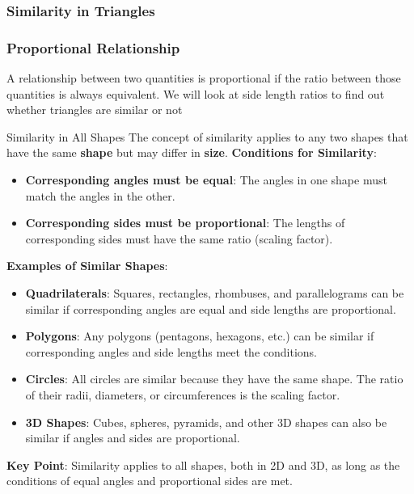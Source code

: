 \documentclass{beamer}
\begin{document}
\begin{frame}
    \frametitle{Similarity in Triangles}
\end{frame}



\begin{frame}
    \frametitle{Proportional Relationship}
    A relationship between two quantities is proportional if the ratio between those quantities is always equivalent. We will look at side length ratios to find out whether triangles are similar or not
\end{frame}

\begin{frame}{Similarity in All Shapes}
  The concept of similarity applies to any two shapes that have the same \textbf{shape} but may differ in \textbf{size}.
    \vspace{10pt}
    \textbf{Conditions for Similarity}:
    \begin{itemize}
        \item \textbf{Corresponding angles must be equal}: The angles in one shape must match the angles in the other.
        \item \textbf{Corresponding sides must be proportional}: The lengths of corresponding sides must have the same ratio (scaling factor).
    \end{itemize}
\end{frame}

\begin{frame}
    \vspace{10pt}
    \textbf{Examples of Similar Shapes}:
    \begin{itemize}
        \item \textbf{Quadrilaterals}: Squares, rectangles, rhombuses, and parallelograms can be similar if corresponding angles are equal and side lengths are proportional.
        \item \textbf{Polygons}: Any polygons (pentagons, hexagons, etc.) can be similar if corresponding angles and side lengths meet the conditions.
        \item \textbf{Circles}: All circles are similar because they have the same shape. The ratio of their radii, diameters, or circumferences is the scaling factor.
        \item \textbf{3D Shapes}: Cubes, spheres, pyramids, and other 3D shapes can also be similar if angles and sides are proportional.
    \end{itemize}

    \vspace{10pt}
    \textbf{Key Point}: Similarity applies to all shapes, both in 2D and 3D, as long as the conditions of equal angles and proportional sides are met.
\end{frame}
\end{document}

